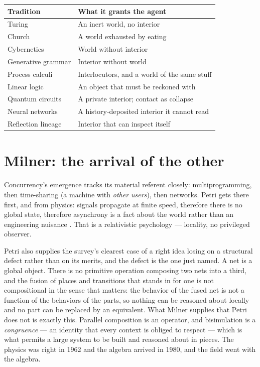 \begin{center}
\begin{tabular}{@{}ll@{}}
\toprule
\textbf{Tradition} & \textbf{What it grants the agent} \\
\midrule
Turing & An inert world, no interior \\
Church & A world exhausted by eating \\
Cybernetics & World without interior \\
Generative grammar & Interior without world \\
Process calculi & Interlocutors, and a world of the same stuff \\
Linear logic & An object that must be reckoned with \\
Quantum circuits & A private interior; contact as collapse \\
Neural networks & A history-deposited interior it cannot read \\
Reflection lineage & Interior that can inspect itself \\
\bottomrule
\end{tabular}
\end{center}

\section{Milner: the arrival of the other}
\label{psy:sec:milner}

Concurrency's emergence tracks its material referent closely:
multiprogramming, then time-sharing (a machine with \emph{other
users}), then networks.
Petri gets there first, and from physics: signals propagate at
finite speed, therefore there is no global state, therefore
asynchrony is a fact about the world rather than an engineering
nuisance \cite{petri1962}.
That is a relativistic psychology --- locality, no privileged
observer.

Petri also supplies the survey's clearest case of a right idea
losing on a structural defect rather than on its merits, and the
defect is the one just named.
A net is a global object.
There is no primitive operation composing two nets into a third, and
the fusion of places and transitions that stands in for one is not
compositional in the sense that matters: the behavior of the fused
net is not a function of the behaviors of the parts, so nothing can
be reasoned about locally and no part can be replaced by an
equivalent.
What Milner supplies that Petri does not is exactly this.
Parallel composition is an operator, and bisimulation is a
\emph{congruence} --- an identity that every context is obliged to
respect --- which is what permits a large system to be built and
reasoned about in pieces.
The physics was right in 1962 and the algebra arrived in 1980, and
the field went with the algebra.

